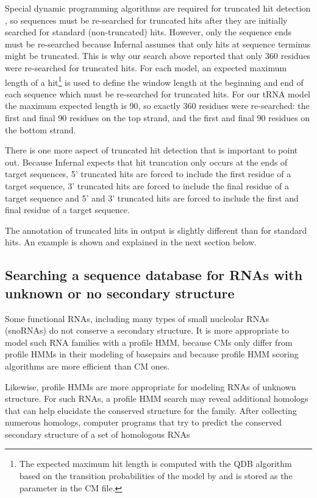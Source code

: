 Special dynamic programming algorithms are required for truncated hit
detection \cite{KolbeEddy09}, so sequences must be re-searched for
truncated hits after they are initially searched for standard
(non-truncated) hits. However, only the sequence ends must be
re-searched because Infernal assumes that only hits at sequence
terminus might be truncated. This is why our search above reported
that only 360 residues were re-searched for truncated hits. For each
model, an expected maximum length of a hit\footnote{The expected
maximum hit length is computed with the QDB algorithm
\cite{NawrockiEddy07} based on the transition probabilities of the
model by  and is stored as the  parameter in
the CM file.}  is used to define the window length at the beginning
and end of each sequence which must be re-searched for truncated
hits. For our tRNA model the maximum expected length is 90, so
exactly 360 residues were re-searched: the first and final 90 residues
on the top strand, and the first and final 90 residues on the bottom
strand. 

There is one more aspect of truncated hit detection that is important
to point out. Because Infernal expects that hit truncation only occurs
at the ends of target sequences, 5' truncated hits are forced to
include the first residue of a target sequence, 3' truncated hits are
forced to include the final residue of a target sequence and 5' and 3'
truncated hits are forced to include the first and final residue of a
target sequence. 

The annotation of truncated hits in  output is slightly
different than for standard hits. An example is shown and explained
in the next section below. 

\subsection{Searching a sequence database for RNAs with unknown or no
 secondary structure}

Some functional RNAs, including many types of small nucleolar RNAs
(snoRNAs) do not conserve a secondary structure. It is more
appropriate to model such RNA families with a profile HMM, because CMs
only differ from profile HMMs in their modeling of basepairs and
because profile HMM scoring algorithms are more efficient than CM
ones. 

Likewise, profile HMMs are more appropriate for modeling RNAs of
unknown structure. For such RNAs, a profile HMM search may reveal
additional homologs that can help elucidate the conserved structure
for the family. After collecting numerous homologs, computer programs
that try to predict the conserved secondary structure of a set of
homologous RNAs 

